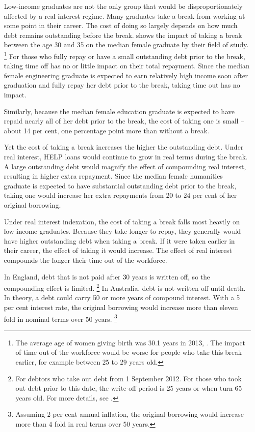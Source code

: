 \documentclass[embargoed]{grattan}
\begin{document}
Low-income graduates are not the only group that would be disproportionately affected by a real interest regime.
Many graduates take a break from working at some point in their career.
The cost of doing so largely depends on how much debt remains outstanding before the break.
 shows the impact of taking a break between the age 30 and 35 on the median female graduate by their field of study.%
\footnote{The average age of women giving birth was 30.1 years in 2013, \textcite{AIHW2015Australiasmothersbabies}.
The impact of time out of the workforce would be worse for people who take this break earlier, for example between 25 to 29 years old.} 
For those who fully repay or have a small outstanding debt prior to the break, taking time off has no or little impact on their total repayment.
Since the median female engineering graduate is expected to earn relatively high income soon after graduation and fully repay her debt prior to the break, taking time out has no impact.

Similarly, because the median female education graduate is expected to have repaid nearly all of her debt prior to the break, the cost of taking one is small -- about 14 per cent, one percentage point more than without a break.

Yet the cost of taking a break increases the higher the outstanding debt.
Under real interest, \gls{HELP} loans would continue to grow in real terms during the break.
A large outstanding debt would magnify the effect of compounding real interest, resulting in higher extra repayment.
Since the median female humanities graduate is expected to have substantial outstanding debt prior to the break, taking one would increase her extra repayments from 20 to 24 per cent of her original borrowing.

Under real interest indexation, the cost of taking a break falls most heavily on low-income graduates.
Because they take longer to repay, they generally would have higher outstanding debt when taking a break.
If it were taken earlier in their career, the effect of taking it would increase.
The effect of real interest compounds the longer their time out of the workforce.

In England, debt that is not paid after 30 years is written off, so the compounding effect is limited.%
\footnote{For debtors who take out debt from 1 September 2012.
For those who took out debt prior to this date, the write-off period is 25 years or when turn 65 years old.
For more details, see \textcite{Company2016LoanCancellation}.} 
In Australia, debt is not written off until death.
In theory, a debt could carry 50 or more years of compound interest.
With a 5 per cent interest rate, the original borrowing would increase more than eleven fold in nominal terms over 50 years.%
\footnote{Assuming 2 per cent annual inflation, the original borrowing would increase more than 4 fold in real terms over 50 years.}
\end{document}
